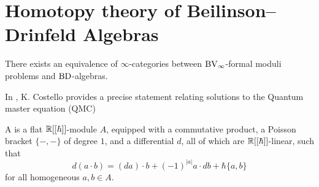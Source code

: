 
\section{Homotopy theory of Beilinson--Drinfeld Algebras}

\begin{theorem}
There exists an equivalence of $\infty$-categories between $\mathrm{BV}_\infty$-formal moduli problems and $\mathrm{BD}$-algebras. 
\end{theorem}


%
%

In \cite[\S2.8]{costello2011renormalization}, K. Costello provides a precise statement relating solutions to the Quantum master equation (QMC)

\begin{definition}\label{def:BD-algebra}
	A  is a flat \(\mathbb{R}[[\hbar]]\)-module \(A\), equipped with a commutative product, a Poisson bracket \(\{-,-\}\) of degree \(1\), and a differential \(d\), all of which are \(\mathbb{R}[[\hbar]]\)-linear, such that
	\[
	d(a \cdot b) = (da) \cdot b + (-1)^{|a|} a \cdot db + \hbar\{a, b\}
	\]
	for all homogeneous \(a, b \in A\).
\end{definition}

